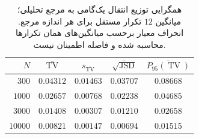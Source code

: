 \begin{table}[htbp]
\centering\small
\caption{همگرایی توزیع انتقال یک‌گامی به مرجع تحلیلی؛ میانگین $12$ تکرار مستقل برای هر اندازه مرجع. انحراف معیار برحسب میانگین‌های همان تکرارها محاسبه شده و فاصله اطمینان نیست.}
\label{tab:ch4-q-population-convergence}
\begin{tabular}{rcccc}\hline
$N$ & $\overline{\operatorname{TV}}$ & $s_{\overline{\operatorname{TV}}}$ &
$\overline{\sqrt{\operatorname{JSD}}}$ & $\overline{P_{95}(\operatorname{TV})}$\\\hline
$300$ & $0.04312$ & $0.01463$ & $0.03707$ & $0.08668$\\
$1000$ & $0.02657$ & $0.00768$ & $0.02238$ & $0.04685$\\
$3000$ & $0.01408$ & $0.00307$ & $0.01210$ & $0.02658$\\
$10000$ & $0.00821$ & $0.00147$ & $0.00694$ & $0.01515$\\
\hline
\end{tabular}
\end{table}
